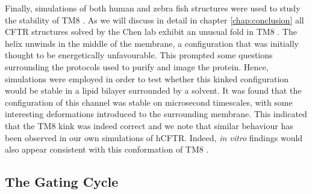 Finally, simulations of both human and zebra fish structures were used to study the stability of TM8 \cite{corradi2018}. As we will discuss in detail in chapter \ref{chap:conclusion} all CFTR structures solved by the Chen lab exhibit an unusual fold in TM8 \cite{fiedorczuk2021, liu2017, liu2019, zhang2016, zhang2018a, zhang2017a}. The helix unwinds in the middle of the membrane, a configuration that was initially thought to be energetically unfavourable. This prompted some questions surrounding the protocols used to purify and image the protein. Hence, simulations were employed in order to test whether this kinked configuration would be stable in a lipid bilayer surrounded by a solvent. It was found that the configuration of this channel was stable on microsecond timescales, with some interesting deformations introduced to the surrounding membrane. This indicated that the TM8 kink was indeed correct and we note that similar behaviour has been observed in our own simulations of hCFTR. Indeed, \textit{in vitro} findings would also appear consistent with this conformation of TM8 \cite{negoda2019}. 



\subsection{The Gating Cycle}

